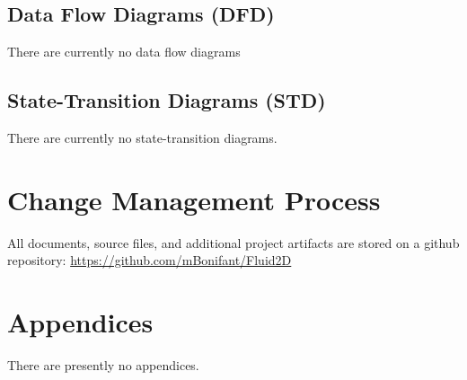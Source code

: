 \documentclass{scrartcl}
\begin{document}
\subsection{Data Flow Diagrams (DFD)}
There are currently no data flow diagrams

\subsection{State-Transition Diagrams (STD)}
There are currently no state-transition diagrams.

\section{Change Management Process}
All documents, source files, and additional project artifacts are stored on a github repository:
\href{https://github.com/mBonifant/Fluid2D}{https://github.com/mBonifant/Fluid2D}

\section{Appendices}
There are presently no appendices. 
\end{document}
